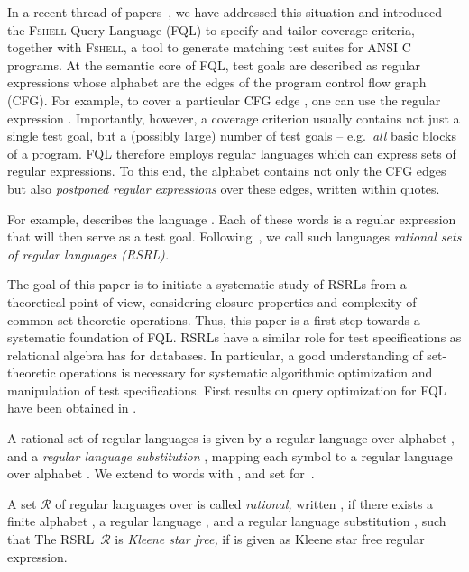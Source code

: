\documentclass[envcountsame]{llncs}
\newcommand{\rationalset}{\ensuremath{\mathcal{R}}\xspace}
\newcommand{\RegularlyGeneratedLanguageSets}{rational sets of regular languages\xspace}
\newcommand{\RegularlyGeneratedLanguageSet}{rational set of regular languages\xspace}
\newcommand{\RegularlyGeneratedLanguageSetAbbrev}{RSRL\xspace}
\newcommand{\RegularlyGeneratedLanguageSetsAbbrev}{RSRLs\xspace}
\newcommand{\RegularlyGeneratedLanguageSetsTitle}{Rational Sets of Regular Languages\xspace}
\newcommand{\ARegularlyGeneratedLanguageSet}{rational\xspace}
\newcommand{\FSHELL}{\textsc{Fshell}\xspace}
\newcommand{\FQL}{FQL\xspace}
\begin{document}
In a recent thread of
papers~\cite{FQL-ASE,holzer11:_seaml_testin_for_model_and_code,holzer10:_introd_to_test_specif_in_fql,holzer09:_query_dirven_progr_testin,holzer08,DBLP:conf/esop/BeyerHTV13},
we have addressed this situation and introduced the \FSHELL Query
Language (\FQL) to specify and tailor coverage criteria, together with
\FSHELL, a tool to generate matching test suites for ANSI C programs.
At the semantic core of \FQL, test goals are described as regular expressions whose alphabet are the edges
of the program control flow graph (CFG). For example, to cover a particular CFG edge , one can use the
regular expression . Importantly, however, a coverage criterion usually contains
not just a single test goal, but a (possibly large) number of test goals -- e.g.~{\em all} basic blocks
of a program. \FQL therefore employs regular languages which can express sets of regular expressions.
To this end, the alphabet contains not only the CFG edges but also \emph{postponed regular expressions} over these edges, written within quotes.

For example,  describes the language   . Each of these words is a regular expression that will then serve as a test goal. Following~\cite{membership},
  we call such languages \emph{\RegularlyGeneratedLanguageSets
  (\RegularlyGeneratedLanguageSetAbbrev).}

The goal of this paper is to initiate a systematic study of \RegularlyGeneratedLanguageSetsAbbrev from a
theoretical point of view, considering closure properties and complexity of common set-theoretic operations.
Thus, this paper is a first step towards a systematic foundation of \FQL. \RegularlyGeneratedLanguageSetsAbbrev have
a similar role for test specifications as relational algebra has for databases. In particular, a good understanding
of set-theoretic operations is necessary for systematic algorithmic optimization and manipulation of test specifications.
First results on query optimization for \FQL have been obtained in \cite{DBLP:conf/esop/BeyerHTV13}.

A \RegularlyGeneratedLanguageSet is given by a regular
language  over alphabet , and a \emph{regular language
  substitution} , mapping
each symbol  to a regular language 
over alphabet .
We extend  to words  with , and set  for~.






\begin{definition}[\RegularlyGeneratedLanguageSetsTitle,
  \RegularlyGeneratedLanguageSetsAbbrev~\cite{membership}]
  \label{def:rational-set}
  A set \rationalset of regular languages over  is called
  \emph{\ARegularlyGeneratedLanguageSet,} written , if there exists
  a finite alphabet , a regular language , and a regular language substitution , such that 
The \RegularlyGeneratedLanguageSetAbbrev~\rationalset is \emph{Kleene star free,} if  is
  given as Kleene star free regular expression.
\end{definition}
\end{document}
